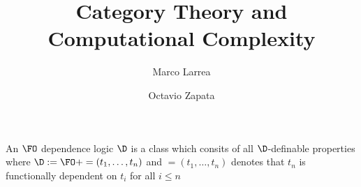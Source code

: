  \usepackage{amsmath, amsthm, amssymb}
 \usepackage[full]{complexity}



\title{Category Theory and \\ Computational Complexity}
\author{Marco Larrea \and Octavio Zapata}


\maketitle

An $\FO$ dependence logic $\D$ is a class which consits of all $\D$-definable properties where $\D := \FO + =(t_1,\dots,t_n)$ and $=(t_1,\dots,t_n)$ denotes that $t_n$ is functionally dependent on $t_{i}$ for all $i\leq n$

\nocite{*}




